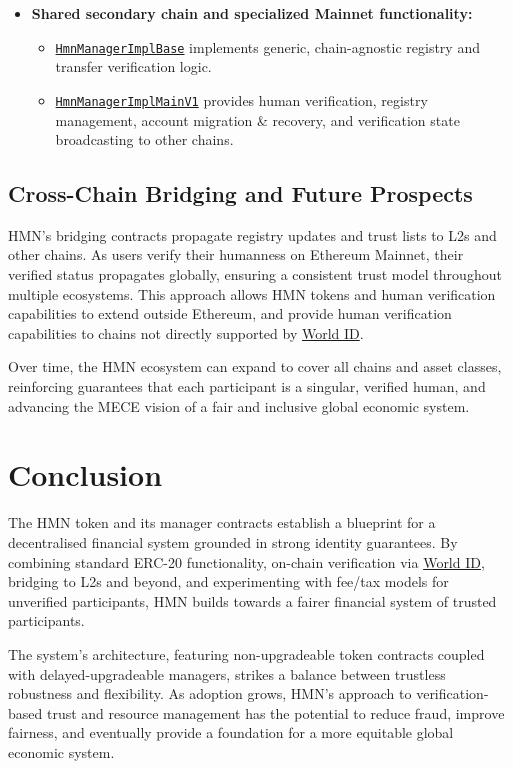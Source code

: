 \documentclass[12pt,a4paper]{article}
\begin{document}
\begin{itemize}
    \item \textbf{Shared secondary chain and specialized Mainnet functionality:}
          \begin{itemize}
              \item \texttt{\href{https://github.com/hmn-is/hmn-contracts/blob/main/src/HmnManagerImplBase.sol}{HmnManagerImplBase}} implements generic, chain-agnostic registry and transfer verification logic.
              \item \texttt{\href{https://github.com/hmn-is/hmn-contracts/blob/main/src/HmnManagerImplMainV1.sol}{HmnManagerImplMainV1}} provides human verification, registry management, account migration \& recovery, and verification state broadcasting to other chains.
          \end{itemize}
\end{itemize}

\subsection{Cross-Chain Bridging and Future Prospects}
HMN's bridging contracts propagate registry updates and trust lists to L2s and other chains.
As users verify their humanness on Ethereum Mainnet, their verified status propagates globally, ensuring a consistent trust model throughout multiple ecosystems.
This approach allows HMN tokens and human verification capabilities to extend outside Ethereum, and provide human verification capabilities to chains not directly supported by \href{https://world.org/world-id}{World ID}.

Over time, the HMN ecosystem can expand to cover all chains and asset classes, reinforcing guarantees that each participant is a singular, verified human, and advancing the MECE vision of a fair and inclusive global economic system.

\section{Conclusion}
The HMN token and its manager contracts establish a blueprint for a decentralised financial system grounded in strong identity guarantees.
By combining standard ERC-20 functionality, on-chain verification via \href{https://world.org/world-id}{World ID}, bridging to L2s and beyond, and experimenting with fee/tax models for unverified participants, HMN builds towards a fairer financial system of trusted participants.

The system's architecture, featuring non-upgradeable token contracts coupled with delayed-upgradeable managers, strikes a balance between trustless robustness and flexibility.
As adoption grows, HMN's approach to verification-based trust and resource management has the potential to reduce fraud, improve fairness, and eventually provide a foundation for a more equitable global economic system.
\end{document}

